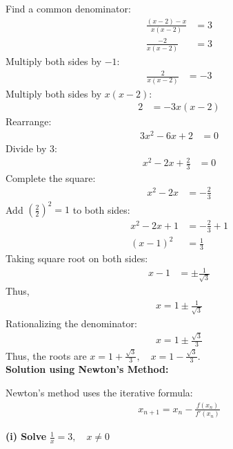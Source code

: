 \documentclass[journal]{IEEEtran}
\begin{document}
Find a common denominator:
\begin{align}
    \frac{(x-2) - x}{x(x-2)} &= 3 \\
    \frac{-2}{x(x-2)} &= 3
\end{align}
Multiply both sides by $-1$:
\begin{align}
    \frac{2}{x(x-2)} &= -3
\end{align}
Multiply both sides by $x(x-2)$:
\begin{align}
    2 &= -3x(x-2)
\end{align}
Rearrange:
\begin{align}
    3x^2 - 6x + 2 &= 0
\end{align}
Divide by 3:
\begin{align}
    x^2 - 2x + \frac{2}{3} &= 0
\end{align}
Complete the square:
\begin{align}
    x^2 - 2x &= -\frac{2}{3}
\end{align}
Add $\left(\frac{2}{2}\right)^2 = 1$ to both sides:
\begin{align}
    x^2 - 2x + 1 &= -\frac{2}{3} + 1 \\
    (x-1)^2 &= \frac{1}{3}
\end{align}
Taking square root on both sides:
\begin{align}
    x - 1 &= \pm \frac{1}{\sqrt{3}}
\end{align}
Thus,
\begin{align}
    x = 1 \pm \frac{1}{\sqrt{3}}
\end{align}
Rationalizing the denominator:
\begin{align}
    x = 1 \pm \frac{\sqrt{3}}{3}
\end{align}
Thus, the roots are $x = 1 + \frac{\sqrt{3}}{3}, \quad x = 1 - \frac{\sqrt{3}}{3}$.\\
\textbf{Solution using Newton's Method:}

Newton's method uses the iterative formula:
\begin{align}
    x_{n+1} = x_n - \frac{f(x_n)}{f'(x_n)}
\end{align}

\textbf{(i) Solve } $\frac{1}{x} = 3, \quad x \neq 0$
\end{document}
